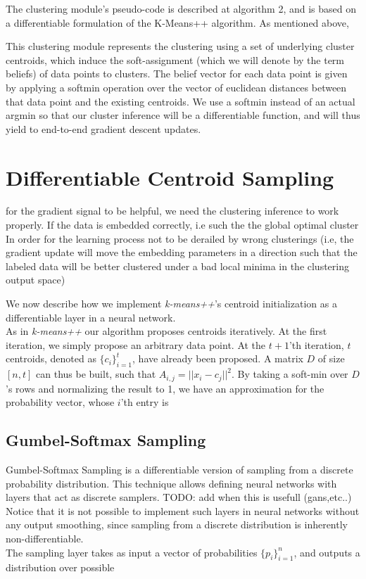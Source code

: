 The clustering module's pseudo-code is described at algorithm 2, and is based on a differentiable formulation of the K-Means++ algorithm. As mentioned above,

This clustering module represents the clustering using a set of underlying cluster centroids, which induce the soft-assignment (which we will denote by the term beliefs) of data points to clusters. The belief vector for each data point is given by applying a softmin operation over the vector of euclidean distances between that data point and the existing centroids. We use a softmin instead of an actual argmin so that our cluster inference will be a differentiable function, and will thus yield to end-to-end gradient descent updates.

\section{Differentiable Centroid Sampling}
for the gradient signal to be helpful, we need the clustering inference to work properly. If the data is embedded correctly, i.e such the the global optimal cluster
In order for the learning process not to be derailed by wrong clusterings (i.e, the gradient update will move the embedding parameters in a direction such that the labeled data will be better clustered under a bad local minima in the clustering output space)

We now describe how we implement {\it{k-means++}}'s centroid initialization as a differentiable layer in a neural network.\\
As in {\it{k-means++}} our algorithm proposes centroids iteratively. At the first iteration, we simply propose an arbitrary data point. At the $t+1$'th iteration, $t$ centroids, denoted as $\{c_i\}_{i=1}^{t}$, have already been proposed. 
A matrix $D$ of size $[n,t]$ can thus be built, such that $A_{i,j} =  ||x_i-c_j||^2$. By taking a soft-min over $D$'s rows and normalizing the result to 1, we have an approximation for the probability vector, whose $i$'th entry is  \\
\subsection{Gumbel-Softmax Sampling}
Gumbel-Softmax Sampling is a differentiable version of sampling from a discrete probability distribution. This technique allows defining neural networks with layers that act as discrete samplers. 
TODO: add when this is usefull (gans,etc..)
Notice that it is not possible to implement such layers in neural networks without any output smoothing, since sampling from a discrete distribution is inherently non-differentiable.\\
The sampling layer takes as input a vector of probabilities $\{p_i\}_{i=1}^{n}$, and outputs a distribution over possible 

